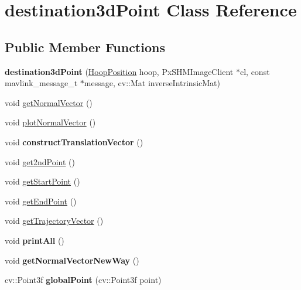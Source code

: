\hypertarget{classdestination3dPoint}{
\section{destination3dPoint Class Reference}
\label{classdestination3dPoint}
}
\subsection*{Public Member Functions}
\begin{DoxyCompactItemize}
\item 
\hypertarget{classdestination3dPoint_ad4e967b9b05d39cc54f8b3957cbf45b0}{
{\bfseries destination3dPoint} (\hyperlink{classHoopPosition}{HoopPosition} hoop, PxSHMImageClient $\ast$cl, const mavlink\_\-message\_\-t $\ast$message, cv::Mat inverseIntrinsicMat)}
\label{classdestination3dPoint_ad4e967b9b05d39cc54f8b3957cbf45b0}

\item 
void \hyperlink{classdestination3dPoint_ab14b35b6e3c883b59c73287ecef7e9f1}{getNormalVector} ()
\item 
void \hyperlink{classdestination3dPoint_a5c820e89503a4953927abd058052f61e}{plotNormalVector} ()
\item 
\hypertarget{classdestination3dPoint_aa9c78402022aa6f01aaeba12fa78df35}{
void {\bfseries constructTranslationVector} ()}
\label{classdestination3dPoint_aa9c78402022aa6f01aaeba12fa78df35}

\item 
void \hyperlink{classdestination3dPoint_a1568373383430825a07cb1461a791b81}{get2ndPoint} ()
\item 
void \hyperlink{classdestination3dPoint_a1a3703cd1784ae01f9dfd51d95eeddac}{getStartPoint} ()
\item 
void \hyperlink{classdestination3dPoint_ae0586247652e291bdb4d263de8661af1}{getEndPoint} ()
\item 
void \hyperlink{classdestination3dPoint_ab0ddbad1aec792b28155529dc2d7a524}{getTrajectoryVector} ()
\item 
\hypertarget{classdestination3dPoint_a24ceba7d5c0fdeb4d77dd23d54176b42}{
void {\bfseries printAll} ()}
\label{classdestination3dPoint_a24ceba7d5c0fdeb4d77dd23d54176b42}

\item 
\hypertarget{classdestination3dPoint_a0a4c874dfcf2fa239b85dcbee83469bd}{
void {\bfseries getNormalVectorNewWay} ()}
\label{classdestination3dPoint_a0a4c874dfcf2fa239b85dcbee83469bd}

\item 
\hypertarget{classdestination3dPoint_a90a0d9e67a88e6bb919bddc7983f6dea}{
cv::Point3f {\bfseries globalPoint} (cv::Point3f point)}
\label{classdestination3dPoint_a90a0d9e67a88e6bb919bddc7983f6dea}

\end{DoxyCompactItemize}
